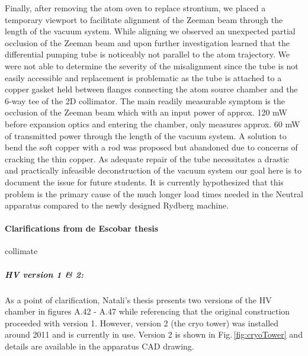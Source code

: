 Finally, after removing the atom oven to replace strontium, we placed a temporary viewport to facilitate alignment of the Zeeman beam through the length of the vacuum system. 
While aligning we observed an unexpected partial occlusion of the Zeeman beam and upon further investigation learned that the differential pumping tube is noticeably not parallel to the atom trajectory.
We were not able to determine the severity of the misalignment since the tube is not easily accessible and replacement is problematic as the tube is attached to a copper gasket held between flanges connecting the atom source chamber and the 6-way tee of the 2D collimator. 
The main readily measurable symptom is the occlusion of the Zeeman beam which with an input power of approx. 120 mW before expansion optics and entering the chamber, only measures approx. 60 mW of transmitted power through the length of the vacuum system. 
A solution to bend the soft copper with a rod was proposed but abandoned due to concerns of cracking the thin copper.
As adequate repair of the tube necessitates a drastic and practically infeasible deconstruction of the vacuum system our goal here is to document the issue for future students.
It is currently hypothesized that this problem is the primary cause of the much longer load times needed in the Neutral apparatus compared to the newly designed Rydberg machine.

\paragraph{Clarifications from de Escobar thesis}

collimate 
\subparagraph{HV version 1 \& 2:}
As a point of clarification, Natali's thesis \cite{MartinezdeEscolar2010} presents two versions of the HV chamber in figures A.42 - A.47 while referencing that the original construction proceeded with version 1. 
However, version 2 (the cryo tower) was installed around 2011 and is currently in use. Version 2 is shown in Fig.\,\ref{fig:cryoTower} and details are available in the apparatus CAD drawing.

